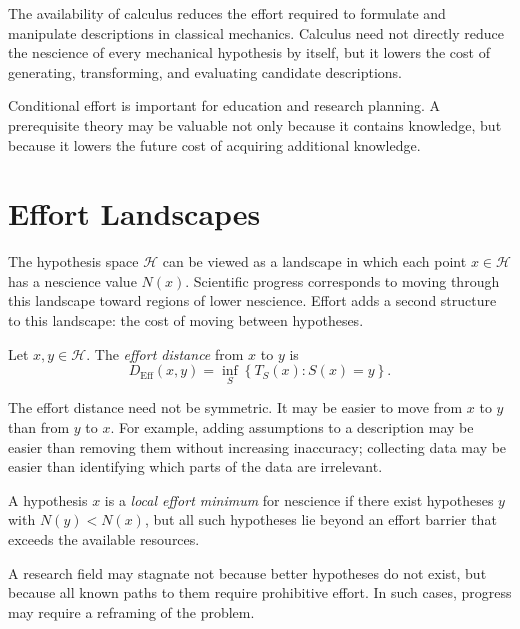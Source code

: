 \begin{example}
The availability of calculus reduces the effort required to formulate and manipulate descriptions in classical mechanics. Calculus need not directly reduce the nescience of every mechanical hypothesis by itself, but it lowers the cost of generating, transforming, and evaluating candidate descriptions.
\end{example}

Conditional effort is important for education and research planning. A prerequisite theory may be valuable not only because it contains knowledge, but because it lowers the future cost of acquiring additional knowledge.

\section{Effort Landscapes}
\label{sec:effort_landscapes}

The hypothesis space \(\mathcal{H}\) can be viewed as a landscape in which each point \(x\in\mathcal{H}\) has a nescience value \(N(x)\). Scientific progress corresponds to moving through this landscape toward regions of lower nescience. Effort adds a second structure to this landscape: the cost of moving between hypotheses.

\begin{definition}
Let \(x,y\in\mathcal{H}\). The \emph{effort distance} from \(x\) to \(y\) is
\[
D_{\mathrm{Eff}}(x,y)
=
\inf_S
\left\{
T_S(x):S(x)=y
\right\}.
\]
\end{definition}

The effort distance need not be symmetric. It may be easier to move from \(x\) to \(y\) than from \(y\) to \(x\). For example, adding assumptions to a description may be easier than removing them without increasing inaccuracy; collecting data may be easier than identifying which parts of the data are irrelevant.

\begin{definition}
A hypothesis \(x\) is a \emph{local effort minimum} for nescience if there exist hypotheses \(y\) with \(N(y)<N(x)\), but all such hypotheses lie beyond an effort barrier that exceeds the available resources.
\end{definition}

A research field may stagnate not because better hypotheses do not exist, but because all known paths to them require prohibitive effort. In such cases, progress may require a reframing of the problem.

